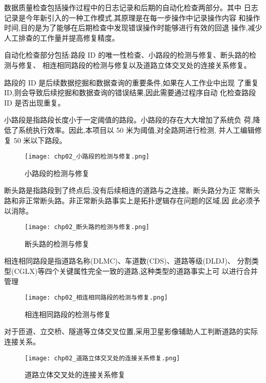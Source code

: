 数据质量检查包括操作过程中的日志记录和后期的自动化检查两部分。其中
日志记录是今年新引入的一种工作模式,其原理是在每一步操作中记录操作内容
和操作时间,目的是为了能够在后期检查中发现错误操作时能够进行有效的回退
操作,减少人工排查的工作量并提高修复精度。

自动化检查部分包括:路段 ID 的唯一性检查、小路段的检测与修复、断头路的检测与修复、
相连相同路段的检测与修复以及道路立体交叉处的连接关系修复。

路段的 ID 是后续数据挖掘和数据查询的重要条件,如果在人工作业中出现
了重复 ID,则会导致后续挖掘和数据查询的错误结果,因此需要通过程序自动
化检查路段 ID 是否出现重复。

小路段是指路段长度小于一定阈值的路段。小路段的存在大大增加了系统负
荷,降低了系统执行效率。因此,本项目以 50 米为阈值,对全路网进行检测,
并人工编辑修复 50 米以下路段。

\begin{figure}[ht]
  \centering
  \texttt{[image: chp02\_小路段的检测与修复.png]}
  \caption{小路段的检测与修复\label{fig:小路段的检测与修复}}
\end{figure}

断头路是指路段到了终点后,没有后续相连的道路与之连接。断头路分为正
常断头路和非正常断头路。非正常断头路事实上是拓扑逻辑存在问题的区域,因
此必须予以消除。

\begin{figure}[ht]
  \centering
  \texttt{[image: chp02\_断头路的检测与修复.png]}
  \caption{断头路的检测与修复\label{fig:断头路的检测与修复}}
\end{figure}

相连相同路段是指道路名称(DLMC)、车道数(CDS)、道路等级(DLDJ)、
分割类型(CGLX)等四个关键属性完全一致的道路,这种类型的道路事实上可
以进行合并管理

\begin{figure}[!ht]
  \centering
  \texttt{[image: chp02\_相连相同路段的检测与修复.png]}
  \caption{相连相同路段的检测与修复\label{fig:相连相同路段的检测与修复}}
\end{figure}

对于匝道、立交桥、隧道等立体交叉位置,采用卫星影像辅助人工判断道路的实际连接关系。

\begin{figure}[!ht]
  \centering
  \texttt{[image: chp02\_道路立体交叉处的连接关系修复.png]}
  \caption{道路立体交叉处的连接关系修复\label{fig:道路立体交叉处的连接关系修复}}
\end{figure}

